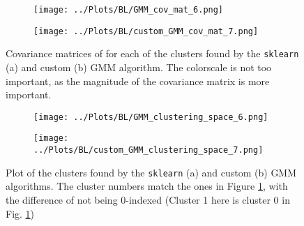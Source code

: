 \documentclass[12pt]{report} %
\begin{document}
\begin{figure}[htbp]
  \centering
  \begin{subfigure}[b]{0.7\textwidth}
      \texttt{[image: ../Plots/BL/GMM\_cov\_mat\_6.png]}
      \caption{}
  \end{subfigure}
  \begin{subfigure}[b]{0.7\textwidth}
      \texttt{[image: ../Plots/BL/custom\_GMM\_cov\_mat\_7.png]}
      \caption{}
  \end{subfigure}
  \caption{Covariance matrices of for each of the clusters found by the \texttt{sklearn} (a) and custom (b) GMM algorithm. The colorscale is not too important, as the magnitude of the covariance matrix is more important.}
  \label{fig:GMM_cov_mat}
\end{figure}


\begin{figure}[htbp]
  \centering
  \begin{subfigure}[b]{0.7\textwidth}
      \texttt{[image: ../Plots/BL/GMM\_clustering\_space\_6.png]}
      \caption{}
  \end{subfigure}
  \begin{subfigure}[b]{0.7\textwidth}
      \texttt{[image: ../Plots/BL/custom\_GMM\_clustering\_space\_7.png]}
      \caption{}
  \end{subfigure}
  \caption{Plot of the clusters found by the \texttt{sklearn} (a) and custom (b) GMM algorithms. The cluster numbers match the ones in Figure \ref{fig:GMM_cov_mat}, with the difference of not being 0-indexed (Cluster 1 here is cluster 0 in Fig. \ref{fig:GMM_cov_mat})}
  \label{fig:GMM_clusters}
\end{figure}

\newpage
\end{document}
